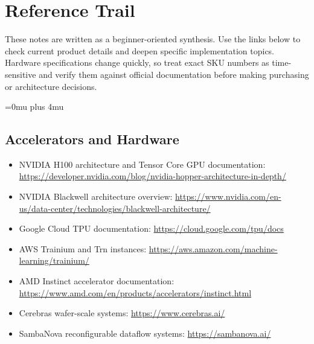 \section{Reference Trail}

These notes are written as a beginner-oriented synthesis. Use the links below to check current product details and deepen specific implementation topics. Hardware specifications change quickly, so treat exact SKU numbers as time-sensitive and verify them against official documentation before making purchasing or architecture decisions.

\begingroup
\sloppy
\Urlmuskip=0mu plus 4mu\relax

\subsection*{Accelerators and Hardware}
\begin{itemize}[leftmargin=*]
  \item NVIDIA H100 architecture and Tensor Core GPU documentation: \url{https://developer.nvidia.com/blog/nvidia-hopper-architecture-in-depth/}
  \item NVIDIA Blackwell architecture overview: \url{https://www.nvidia.com/en-us/data-center/technologies/blackwell-architecture/}
  \item Google Cloud TPU documentation: \url{https://cloud.google.com/tpu/docs}
  \item AWS Trainium and Trn instances: \url{https://aws.amazon.com/machine-learning/trainium/}
  \item AMD Instinct accelerator documentation: \url{https://www.amd.com/en/products/accelerators/instinct.html}
  \item Cerebras wafer-scale systems: \url{https://www.cerebras.ai/}
  \item SambaNova reconfigurable dataflow systems: \url{https://sambanova.ai/}
\end{itemize}

